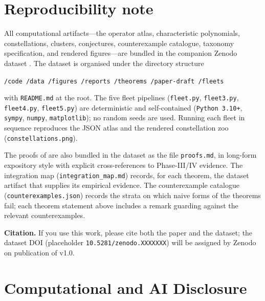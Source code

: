 \documentclass[11pt,a4paper]{article}
\theoremstyle{plain}
\theoremstyle{definition}
\theoremstyle{remark}
\begin{document}
\section{Reproducibility note}\label{sec:reproducibility}

All computational artifacts---the operator atlas, characteristic
polynomials, constellations, clusters, conjectures, counterexample
catalogue, taxonomy specification, and rendered figures---are bundled in
the companion Zenodo dataset \cite{wkb_dataset_v1}. The dataset is
organised under the directory structure
\begin{center}
\texttt{/code\ /data\ /figures\ /reports\ /theorems\ /paper-draft\ /fleets}
\end{center}
with \texttt{README.md} at the root. The five fleet pipelines
(\texttt{fleet.py}, \texttt{fleet3.py}, \texttt{fleet4.py},
\texttt{fleet5.py}) are deterministic and self-contained
(\texttt{Python 3.10+}, \texttt{sympy}, \texttt{numpy},
\texttt{matplotlib}); no random seeds are used. Running each fleet in
sequence reproduces the JSON atlas and the rendered constellation zoo
(\texttt{constellations.png}).

The proofs of 
are also bundled in the dataset as the file \texttt{proofs.md}, in
long-form expository style with explicit cross-references to
Phase-III/IV evidence. The integration map
(\texttt{integration\_map.md}) records, for each theorem, the dataset
artifact that supplies its empirical evidence. The counterexample
catalogue (\texttt{counterexamples.json}) records the strata on which
naive forms of the theorems fail; each theorem statement above includes
a remark guarding against the relevant counterexamples.

\medskip
\noindent\textbf{Citation.} If you use this work, please cite both the
paper and the dataset; the dataset DOI (placeholder
\texttt{10.5281/zenodo.XXXXXXX}) will be assigned by Zenodo on
publication of v1.0.

\section*{Computational and AI Disclosure}\label{sec:disclosure}
\end{document}
